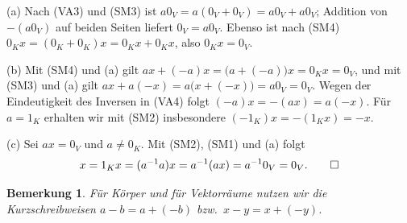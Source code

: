 \documentclass[a4paper]{article}
\makeatletter
\theoremstyle{kurzskript}
\newtheorem*{bem}{Bemerkung}
\renewenvironment{proof}[1][\proofname]{\par\pushQED{\qed}%
  \normalfont\topsep\medskipamount\relax
  \trivlist\item[\hskip\labelsep\bfseries #1\@addpunct{.}]\ignorespaces}%
  {\popQED\endtrivlist\@endpefalse}
\renewcommand{\proofname}{Beweis}
\makeatother
\begin{document}
\begin{proof}
(a) Nach (VA3) und (SM3) ist $a0_V = a(0_V + 0_V) = a0_V + a0_V$; Addition von $-(a0_V)$ auf beiden Seiten liefert $0_V = a0_V$. Ebenso ist nach (SM4) $0_Kx = (0_K + 0_K)x = 0_Kx + 0_Kx$, also $0_Kx = 0_V$.

(b) Mit (SM4) und (a) gilt $ax + (-a)x = \bigl(a + (-a)\bigr)x = 0_Kx = 0_V$, und mit (SM3) und (a) gilt $ax + a(-x) = a\bigl(x + (-x)\bigr) = a0_V = 0_V$. Wegen der Eindeutigkeit des Inversen in (VA4) folgt $(-a)x = -(ax) = a(-x)$. Für $a = 1_K$ erhalten wir mit (SM2) insbesondere $(-1_K)x = -(1_Kx) = -x$.

(c) Sei $ax = 0_V$ und $a \neq 0_K$. Mit (SM2), (SM1) und (a) folgt
\[
  x = 1_Kx = (a^{-1}a)x = a^{-1}(ax) = a^{-1}0_V = 0_V. \qedhere
\]
\end{proof}

\begin{bem}
Für Körper und für Vektorräume nutzen wir die Kurzschreibweisen $a - b = a + (-b)$ bzw.\ $x - y = x + (-y)$.
\end{bem}
\end{document}
